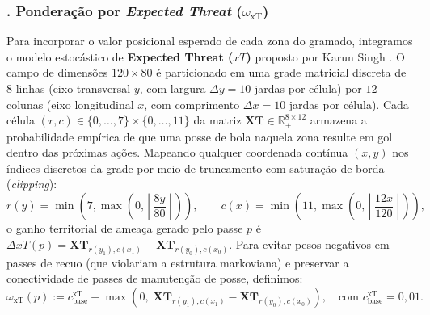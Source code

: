 \documentclass[10pt,a4paper]{article}
\theoremstyle{definition}
\theoremstyle{plain}
\theoremstyle{remark}
\begin{document}
\subsubsection*{. Ponderação por \textit{Expected Threat} (\texorpdfstring{$\omega_{\text{xT}}$}{w\_xT})}
Para incorporar o valor posicional esperado de cada zona do gramado, integramos o modelo estocástico de \textbf{Expected Threat ($xT$)} proposto por Karun Singh \cite{singh2018}. O campo de dimensões $120 \times 80$ é particionado em uma grade matricial discreta de $8$ linhas (eixo transversal $y$, com largura $\Delta y = 10$ jardas por célula) por $12$ colunas (eixo longitudinal $x$, com comprimento $\Delta x = 10$ jardas por célula). Cada célula $(r, c) \in \{0, \dots, 7\} \times \{0, \dots, 11\}$ da matriz $\mathbf{XT} \in \mathbb{R}^{8 \times 12}_{+}$ armazena a probabilidade empírica de que uma posse de bola naquela zona resulte em gol dentro das próximas ações. Mapeando qualquer coordenada contínua $(x, y)$ nos índices discretos da grade por meio de truncamento com saturação de borda (\textit{clipping}):
\[
r(y) = \min\left(7, \max\left(0, \left\lfloor \frac{8 y}{80} \right\rfloor\right)\right), \qquad c(x) = \min\left(11, \max\left(0, \left\lfloor \frac{12 x}{120} \right\rfloor\right)\right),
\]
o ganho territorial de ameaça gerado pelo passe $p$ é $\Delta xT(p) = \mathbf{XT}_{r(y_1), c(x_1)} - \mathbf{XT}_{r(y_0), c(x_0)}$. Para evitar pesos negativos em passes de recuo (que violariam a estrutura markoviana) e preservar a conectividade de passes de manutenção de posse, definimos:
\begin{equation}
\omega_{\text{xT}}(p) := c_{\text{base}}^{\text{xT}} + \max\left(0, \; \mathbf{XT}_{r(y_1), c(x_1)} - \mathbf{XT}_{r(y_0), c(x_0)}\right), \quad \text{com } c_{\text{base}}^{\text{xT}} = 0{,}01.
\label{eq:peso_xt}
\end{equation}
\end{document}
